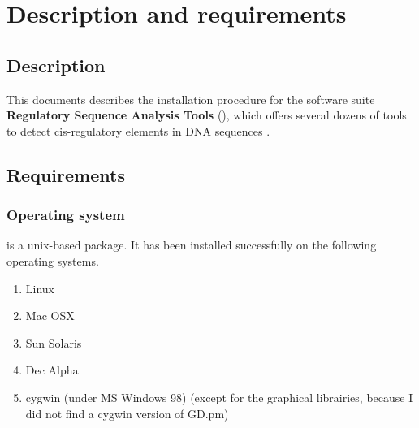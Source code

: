 \documentclass[12pt,a4paper, oneside]{scrreprt} %
\begin{document}


\newpage
\tableofcontents
\newpage

\chapter{Description and requirements}

\section{Description}

This documents describes the installation procedure for the software
suite \textbf{Regulatory Sequence Analysis Tools} (\RSAT), which
offers several dozens of tools to detect cis-regulatory elements in
DNA sequences
\cite{Thomas-Chollier:2008:W119-27,vanHelden:2003:3593-6,vanHelden:2000:177-87}.

\section{Requirements}

\subsection{Operating system}

\RSAT is a unix-based package. It has been installed successfully on
the following operating systems.

\begin{enumerate}
\item Linux

\item Mac OSX

\item Sun Solaris

\item Dec Alpha

\item cygwin (under MS Windows 98) (except for the graphical
librairies, because I did not find a cygwin version of GD.pm)

\end{enumerate}
\end{document}
